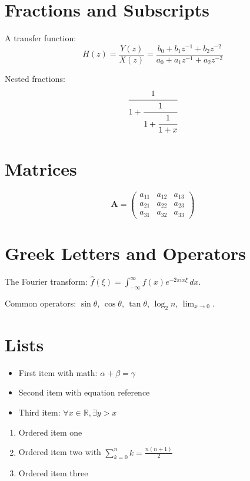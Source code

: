 \documentclass{article}
\begin{document}
\section{Fractions and Subscripts}

A transfer function:
\begin{equation}
H(z) = \frac{Y(z)}{X(z)} = \frac{b_0 + b_1 z^{-1} + b_2 z^{-2}}{a_0 + a_1 z^{-1} + a_2 z^{-2}}
\label{eq:transfer}
\end{equation}

Nested fractions:
\begin{equation}
\cfrac{1}{1 + \cfrac{1}{1 + \cfrac{1}{1 + x}}}
\end{equation}

\section{Matrices}

\begin{equation}
\mathbf{A} = \begin{pmatrix}
a_{11} & a_{12} & a_{13} \\
a_{21} & a_{22} & a_{23} \\
a_{31} & a_{32} & a_{33}
\end{pmatrix}
\end{equation}

\section{Greek Letters and Operators}

The Fourier transform: $\hat{f}(\xi) = \int_{-\infty}^{\infty} f(x) e^{-2\pi i x \xi}\,dx$.

Common operators: $\sin\theta$, $\cos\theta$, $\tan\theta$, $\log_2 n$, $\lim_{x \to 0}$.

\section{Lists}

\begin{itemize}
  \item First item with math: $\alpha + \beta = \gamma$
  \item Second item with equation reference
  \item Third item: $\forall x \in \mathbb{R}, \exists y > x$
\end{itemize}

\begin{enumerate}
  \item Ordered item one
  \item Ordered item two with $\sum_{k=0}^{n} k = \frac{n(n+1)}{2}$
  \item Ordered item three
\end{enumerate}
\end{document}
